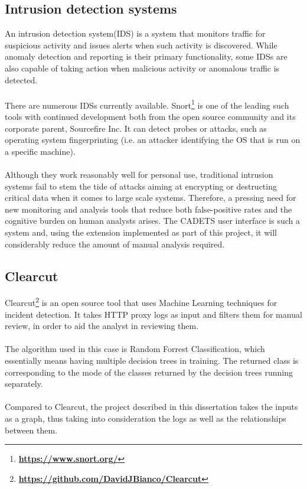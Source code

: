 	\subsection{Intrusion detection systems}
	An intrusion detection system(IDS) is a system that monitors traffic for suspicious activity and issues alerts when such activity is discovered. While anomaly detection and reporting is their primary functionality, some IDSs are also capable of taking action when malicious activity or anomalous traffic is detected. 
	\\ \\
	There are numerous IDSs currently available. Snort\footnote{\textbf{\url{https://www.snort.org/}}} is one of the leading such tools with continued development both from the open source community and its corporate parent, Sourcefire Inc. It can detect probes or attacks, such as operating system fingerprinting (i.e. an attacker identifying the OS that is run on a specific machine). 
	\\ \\
	Although they work reasonably well for personal use, traditional intrusion systems fail to stem the tide of attacks aiming at encrypting or destructing critical data when it comes to large scale systems. Therefore, a pressing need for new monitoring and analysis tools that reduce both false-positive rates and the cognitive burden on human analysts arises. The CADETS user interface is such a system and, using the extension implemented as part of this project, it will considerably reduce the amount of manual analysis required. 
	\subsection{Clearcut}
	Clearcut\footnote{\textbf{\url{https://github.com/DavidJBianco/Clearcut}}} is an open source tool that uses Machine Learning techniques for incident detection. It takes HTTP proxy logs as input and filters them for manual review, in order to aid the analyst in reviewing them. 
	\\ \\ 
	The algorithm used in this case is Random Forrest Classification, which essentially means having multiple decision trees in training. The returned class is corresponding to the mode of the classes returned by the decision trees running separately. 
	\\ \\
	Compared to Clearcut, the project described in this dissertation takes the inputs as a graph, thus taking into consideration the logs as well as the relationships between them. 
	
